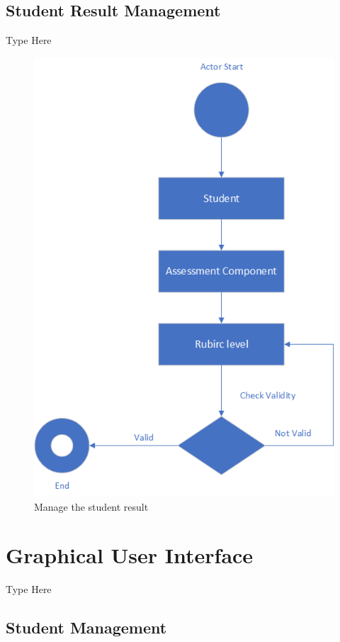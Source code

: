 \documentclass[12pt,a4paper]{article}
\begin{document}
\subsection{Student Result Management}
Type Here
\begin{figure}[H]
  \centering
    \includegraphics[scale=1]{Student Result}

    
  \caption{Manage the student result}
\end{figure}

\section{Graphical User Interface}
Type Here
\subsection{Student Management}
\end{document}
